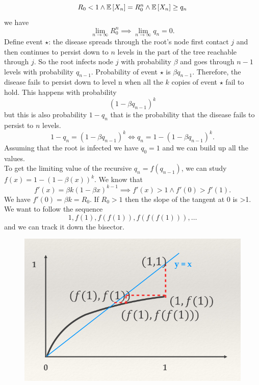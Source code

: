 \documentclass[a4paper,9pt]{extarticle}
\begin{document}
\begin{multicols*}{2}
\begin{equation*}
		R_{0}<1\wedge\mathbb{E}\left[X_{n}\right]=R^{n}_{0}\wedge \mathbb{E}\left[X_{n}\right]\geq q_{n}
	\end{equation*}
	we have 
	\begin{equation*}
		\lim_{n\to\infty}R^{n}_{0}\implies\lim_{n\to\infty}q_{n}=0.
	\end{equation*}
	Define event $\star$: the disease spreads through the root's node first contact $j$ and then
	continues to persist down to $n$ levels in the part of the tree reachable through  $j$. So the root infects node $j$ with probability $\beta$ and goes through $n-1$ levels with probability $q_{n-1}$. Probability of event $\star$ is $\beta q_{n-1}$. Therefore, the disease fails to persist down to level n when all the $k$ copies of
	event $\star$ fail to hold. This happens with probability 
	\begin{equation*}
		(1-\beta q_{n-1})^{k}
	\end{equation*}
	but this is also probability $1-q_{n}$ that is the probability that the disease fails to persist to $n$ levels.
	\begin{equation*}
		1-q_{n}=(1-\beta q_{n-1})^{k}\iff q_{n}=1-(1-\beta q_{n-1})^{k}.
	\end{equation*}
	Assuming that the root is infected we have $q_{0}=1$ and we can build up all the values.\\
	To get the limiting value of the recursive $q_{n}=f(q_{n-1})$, we can study $f(x)=1-(1-\beta (x))^{k}$. We know that 
	\begin{equation*}
		f'(x)=\beta k(1-\beta x)^{k-1}\implies f'(x)>1\wedge f'(0)>f'(1).
	\end{equation*}
	We have $f'(0)=\beta k=R_{0}$. If $R_{0}>1$ then the slope of the tangent at $0$ is >1. We want to follow the sequence 
	\begin{equation*}
		1,f(1),f(f(1)),f(f(f(1))),\ldots
	\end{equation*}
	and we can track it down the bisector.
	\begin{figure}[H]
		\centering
		\includegraphics[width=0.7\linewidth]{screenshot008}

\end{figure}
\end{multicols*}
\end{document}
